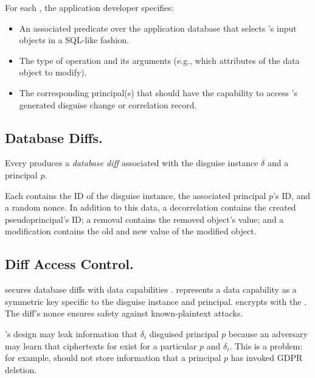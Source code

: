 \noindent For each , the application developer specifies:
\begin{itemize}
    \item An associated predicate over the application database that selects 's input
        objects in a SQL-like fashion.
    \item The type of operation and its arguments (e.g., which attributes of the data object to
        modify).
    \item The corresponding principal(s) that should have the capability to access 's
        generated disguise change or correlation record.
\end{itemize}

\subsection{Database Diffs.}
Every  produces a \emph{database diff}  associated with the disguise instance $\delta$ and a principal $p$. 

Each  contains the ID of the disguise instance, the associated principal $p$'s ID,
and a random nonce.
%
In addition to this data, a decorrelation  contains the created pseudoprincipal's
ID; a removal  contains the removed object's value; and a modification
 contains the old and new value of the modified object.

\subsection{Diff Access Control.} 

\sys secures database diffs with data capabilities .
\sys represents a data capability  as a symmetric key specific to
the disguise instance and principal.
%
\sys encrypts  with the . The diff's nonce ensures safety against
known-plaintext attacks. 

\sys's design may leak information that $\delta_i$ disguised principal $p$ 
because an adversary may learn that ciphertexts for %
 exist for a particular $p$ and $\delta_i$.
This is a problem: for example, \sys should not store information that a principal $p$ has
invoked GDPR deletion.


